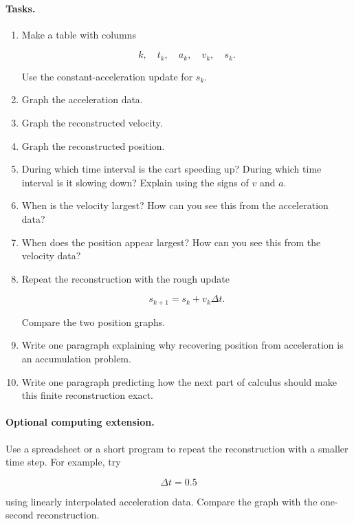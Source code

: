 \paragraph{Tasks.}
\begin{enumerate}
\item Make a table with columns

\[
k,\quad t_k,\quad a_k,\quad v_k,\quad s_k.
\]

Use the constant-acceleration update for \(s_k\).

\item Graph the acceleration data.

\item Graph the reconstructed velocity.

\item Graph the reconstructed position.

\item During which time interval is the cart speeding up?  During which time interval is
it slowing down?  Explain using the signs of \(v\) and \(a\).

\item When is the velocity largest?  How can you see this from the acceleration data?

\item When does the position appear largest?  How can you see this from the velocity
data?

\item Repeat the reconstruction with the rough update

\[
s_{k+1}=s_k+v_k\Delta t.
\]

Compare the two position graphs.

\item Write one paragraph explaining why recovering position from acceleration is an
accumulation problem.

\item Write one paragraph predicting how the next part of calculus should make this
finite reconstruction exact.
\end{enumerate}

\paragraph{Optional computing extension.}
Use a spreadsheet or a short program to repeat the reconstruction with a smaller time
step.  For example, try

\[
\Delta t=0.5
\]

using linearly interpolated acceleration data.  Compare the graph with the one-second
reconstruction.

